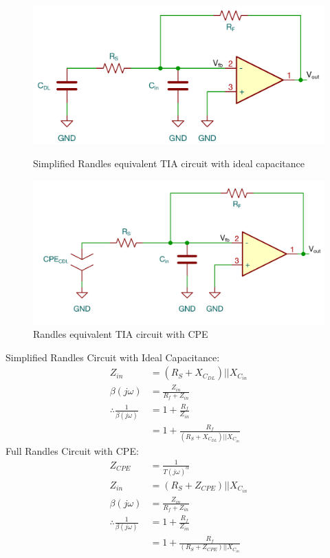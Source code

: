 \begin{figure}[H]
    \centering
    \begin{minipage}{0.5\textwidth}
        \centering
        \includegraphics[width=\textwidth]{RandlesSimpleTIA.png}
        \caption{Simplified Randles equivalent TIA circuit with ideal capacitance}
        \label{fig:randles_cdl_tia}
    \end{minipage}\hfill
    \begin{minipage}{0.5\textwidth}
        \centering
        \includegraphics[width=\textwidth]{RandlesTIA.png}
        \caption{Randles equivalent TIA circuit with CPE}
        \label{fig:randles_cpe_tia}
    \end{minipage}
\end{figure}

Simplified Randles Circuit with Ideal Capacitance:
\begin{align}
    Z_{in} &= (R_S + X_{C_{DL}}) || X_{C_{in}} \label{eq:simple_zin}\\
    \beta (j\omega) &= \frac{Z_{in}}{R_f + Z_{in}} \label{eq:simple_beta} \\
    \therefore \frac{1}{\beta(j\omega)} &= 1 + \frac{R_f}{Z_{in}} \nonumber\\
    &= 1 + \frac{R_f}{(R_S + X_{C_{DL}}) || X_{C_{in}}}
\end{align}
Full Randles Circuit with CPE:
\begin{align}
    Z_{CPE} &= \frac{1}{T(j\omega)^{\alpha}} \\
    Z_{in} &= (R_S + Z_{CPE}) || X_{C_{in}} \\
    \beta (j\omega) &= \frac{Z_{in}}{R_f + Z_{in}} \label{eq:randles_beta}\\
    \therefore \frac{1}{\beta(j\omega)} &= 1 + \frac{R_f}{Z_{in}} \nonumber\\
    &= 1 + \frac{R_f}{(R_S + Z_{CPE}) || X_{C_{in}}}
\end{align}

